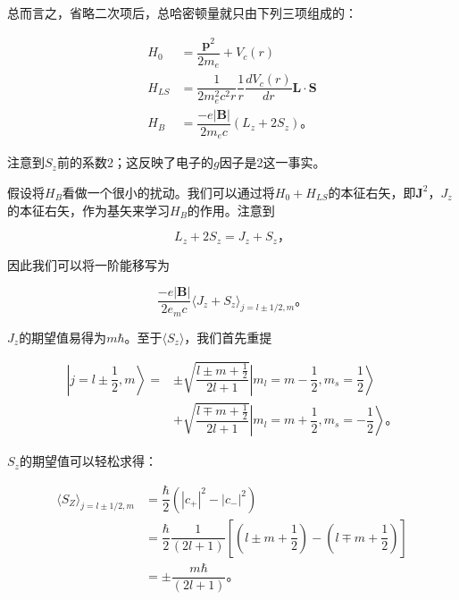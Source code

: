 ﻿\documentclass[UTF8,twoside]{ctexart}
\begin{document}
总而言之，省略二次项后，总哈密顿量就只由下列三项组成的：

\begin{subequations} \label{5.3.42a}
\begin{align}
H_0&=\dfrac{\boldsymbol{p}^2}{2m_e}+V_c(r)\\
 \label{5.3.42b}
H_{LS}&=\dfrac{1}{2m_e^2c^2r}\dfrac{1}{r}\dfrac{dV_c(r)}{dr}\boldsymbol{L\cdot S}\\
\label{5.3.42c}
H_B&=\dfrac{-e|\boldsymbol{B}|}{2m_ec}(L_z+2S_z)\text{。}
\end{align}
\end{subequations}

\noindent 注意到$S_z$前的系数2；这反映了电子的$g$因子是2这一事实。

假设将$H_B$看做一个很小的扰动。我们可以通过将$H_0+H_{LS}$的本征右矢，即$\boldsymbol{J}^2$，$J_z$的本征右矢，作为基矢来学习$H_B$的作用。注意到

\begin{equation} \label{5.3.43}
L_z+2S_z=J_z+S_z\text{，}
\end{equation}

\noindent 因此我们可以将一阶能移写为

\begin{equation} \label{5.3.44}
\dfrac{-e|\boldsymbol{B}|}{2e_mc}\langle J_z+S_z\rangle_{j=l\pm 1/2,m}\text{。}
\end{equation}

\noindent $J_z$的期望值易得为$m\hbar$。至于$\langle S_z\rangle$，我们首先重提

\begin{equation} \label{5.3.45}
\begin{split}
\left|j=l\pm\dfrac{1}{2},m\right\rangle=&\pm\sqrt{\dfrac{l\pm m+\frac{1}{2}}{2l+1}}\left|m_l=m-\dfrac{1}{2},m_s=\dfrac{1}{2}\right\rangle \\
& +\sqrt{\dfrac{l\mp m+\frac{1}{2}}{2l+1}}\left|m_l=m+\dfrac{1}{2},m_s=-\dfrac{1}{2}\right\rangle\text{。}
\end{split}
\end{equation}

\noindent $S_z$的期望值可以轻松求得：

\begin{equation} \label{5.3.46}
\begin{split}
\langle S_Z\rangle_{j=l\pm 1/2,m}&=\dfrac{\hbar}{2}(|c_+|^2-|c_-|^2) \\
&=\dfrac{\hbar}{2}\dfrac{1}{(2l+1)}\left[\left(l\pm m+\dfrac{1}{2}\right)-\left(l\mp m+\dfrac{1}{2}\right)\right] \\
&=\pm \dfrac{m\hbar}{(2l+1)}\text{。}
\end{split}
\end{equation}
\end{document}
